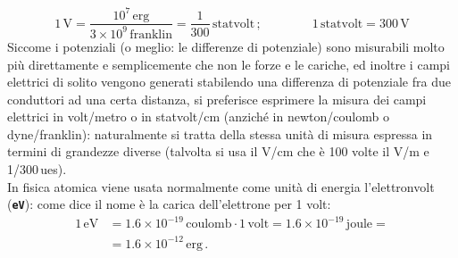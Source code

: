 \begin{equation}
1\,\mathrm{V}=\frac{10^7\,\mathrm{erg}}{3\times10^9\,\mathrm{franklin}}=\frac{1}{300}\,\mathrm{statvolt}\,;\qquad\qquad1\,\mathrm{statvolt}=300\,\mathrm{V}
\tag{1.67}
\end{equation}
Siccome i potenziali (o meglio: le differenze di potenziale) sono misurabili molto più direttamente e semplicemente che non le forze e le cariche, ed inoltre i campi elettrici di solito vengono generati stabilendo una differenza di potenziale fra due conduttori ad una certa distanza, si preferisce esprimere la misura dei campi elettrici in volt/metro o in statvolt/cm (anziché in newton/coulomb o dyne/franklin): naturalmente si tratta della stessa unità di misura espressa in termini di grandezze diverse (talvolta si usa il V/cm che è 100 volte il V/m e 1/300\,ues).\\
In fisica atomica viene usata normalmente come unità di energia l'elettronvolt (\texttt{\textbf{eV}}): come dice il nome è la carica dell'elettrone per 1 volt:
\begin{equation}
\begin{split}
1\,\mathrm{eV}&=1.6\times10^{-19}\,\mathrm{coulomb}\cdot1\,\mathrm{volt}=1.6\times10^{-19}\,\mathrm{joule}=\\
&=1.6\times10^{-12}\,\mathrm{erg}\,.
\end{split}
\tag{1.68}
\end{equation}

